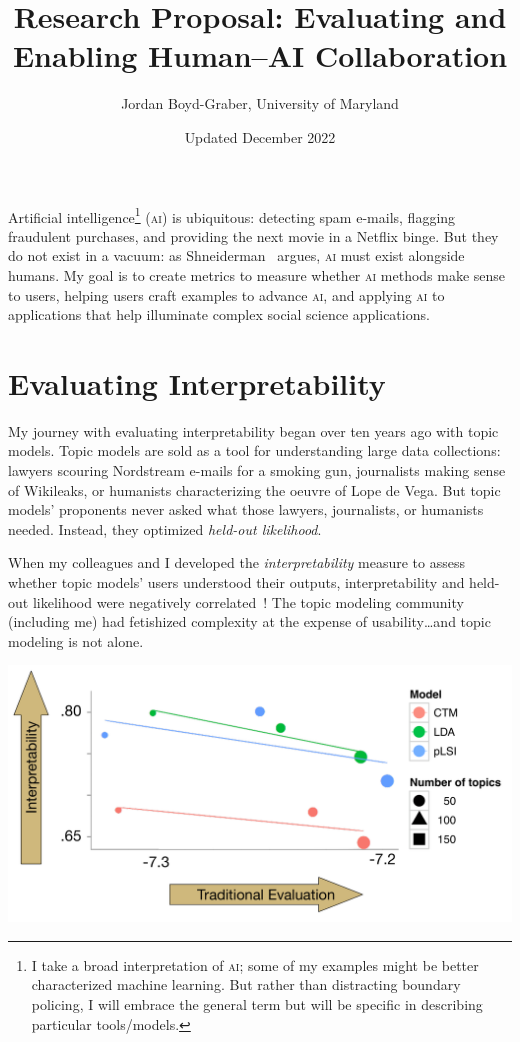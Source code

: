 \documentclass[11pt]{amsart}
\newcommand{\abr}[1]{\textsc{#1}}
\begin{document}
 \title{Research Proposal: Evaluating and Enabling Human--AI Collaboration}

 \author{Jordan Boyd-Graber, University of Maryland}


\date{Updated December 2022}

\maketitle

Artificial intelligence\footnote{I take a broad interpretation of
\abr{ai}; some of my examples might be better characterized machine
learning.  But rather than distracting boundary policing, I will embrace
the general term but will be specific in describing particular tools/models.}
(\abr{ai}) is ubiquitous: detecting spam e-mails, flagging fraudulent
purchases, and providing the next movie in a Netflix binge.
%
But they do not exist in a vacuum: as
Shneiderman~\cite{shneiderman-21} argues, \abr{ai} must exist
alongside humans.
%
My goal is to create metrics to measure whether \abr{ai} methods make
sense to users, helping users craft examples to advance \abr{ai}, and
applying \abr{ai} to applications that help illuminate complex social
science applications.

\section{Evaluating Interpretability}

My journey with evaluating interpretability began over ten years ago
with topic models.
%
Topic models are sold as a tool for understanding large data
collections: lawyers scouring Nordstream e-mails for a smoking gun,
journalists making sense of Wikileaks, or humanists characterizing the
oeuvre of Lope de Vega.
%
But topic models' proponents never asked what those lawyers,
journalists, or humanists needed.
%
Instead, they optimized \emph{held-out likelihood}.

When my colleagues
and I developed the \emph{interpretability} measure to assess whether topic
models' users understood their outputs, interpretability and
held-out likelihood were negatively correlated~\cite{chang-09b}!
%
The topic modeling community (including me) had fetishized complexity
at the expense of usability\dots and topic modeling is not alone.

\begin{center}
\includegraphics[width=.5\linewidth]{images/prec_ll_4}
\end{center}
\end{document}
